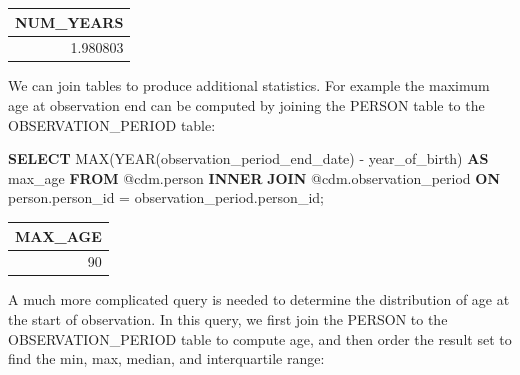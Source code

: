 \documentclass[11pt]{book}
\newenvironment{Shaded}{\begin{snugshade}}{\end{snugshade}}
\newcommand{\KeywordTok}[1]{\textcolor[rgb]{0.13,0.29,0.53}{\textbf{#1}}}
\newcommand{\DataTypeTok}[1]{\textcolor[rgb]{0.13,0.29,0.53}{#1}}
\newcommand{\FunctionTok}[1]{\textcolor[rgb]{0.00,0.00,0.00}{#1}}
\newcommand{\NormalTok}[1]{#1}
\begin{document}
\begin{longtable}[]{@{}r@{}}
\toprule
NUM\_YEARS\tabularnewline
\midrule
\endhead
1.980803\tabularnewline
\bottomrule
\end{longtable}

We can join tables to produce additional statistics. For example the
maximum age at observation end can be computed by joining the PERSON
table to the OBSERVATION\_PERIOD table:

\begin{Shaded}
\begin{Highlighting}[]
\KeywordTok{SELECT} \FunctionTok{MAX}\NormalTok{(}\DataTypeTok{YEAR}\NormalTok{(observation_period_end_date) -}
\NormalTok{           year_of_birth) }\KeywordTok{AS}\NormalTok{ max_age}
\KeywordTok{FROM}\NormalTok{ @cdm.person}
\KeywordTok{INNER} \KeywordTok{JOIN}\NormalTok{ @cdm.observation_period}
  \KeywordTok{ON}\NormalTok{ person.person_id = observation_period.person_id;}
\end{Highlighting}
\end{Shaded}

\begin{longtable}[]{@{}r@{}}
\toprule
MAX\_AGE\tabularnewline
\midrule
\endhead
90\tabularnewline
\bottomrule
\end{longtable}

A much more complicated query is needed to determine the distribution of
age at the start of observation. In this query, we first join the PERSON
to the OBSERVATION\_PERIOD table to compute age, and then order the
result set to find the min, max, median, and interquartile range:
\end{document}
